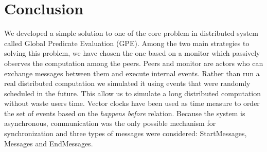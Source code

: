 \documentclass[11pt]{article}
\begin{document}
\section{Conclusion}
We developed a simple solution to one of the core problem in distributed system called Global Predicate Evaluation (GPE). Among the two main strategies to solving this problem, we have chosen the one based on a monitor which passively observes the computation among the peers. Peers and monitor are actors who can exchange messages between them and execute internal events. Rather than run a real distributed computation we simulated it using events that were randomly scheduled in the future. This allow us to simulate a long distributed computation without waste users time. Vector clocks have been used as time measure to order the set of events based on the \textit{happens before} relation. Because the system is asynchronous, communication was the only possible mechanism for synchronization and three types of messages were considered: StartMessages, Messages and EndMessages.



\end{document}
